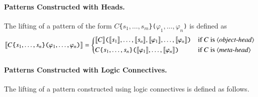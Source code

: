 \documentclass[UTF8,11pt]{article}
\theoremstyle{plain}
\theoremstyle{definition}
\theoremstyle{remark}
\newcommand{\denote}[1]{\llbracket{#1}\rrbracket}
\newcommand{\syntacc}[1]{\text{$\langle$\textit{#1}$\rangle$}}
\begin{document}
\paragraph{Patterns Constructed with Heads.}
The lifting of a pattern of the form
\texttt{$C$\{$s_1,\dots,s_m$\}($\varphi_1,\dots,\varphi_n$)} is defined as
\begin{align*}
\denote{C\texttt{\{}s_1,\dots,s_n\texttt{\}}\texttt{(}\varphi_1,
 \dots,\varphi_n\texttt{)}}
 =
\begin{cases*}
\denote{C}\texttt{(}\denote{s_1},\dots,\denote{s_n},\denote{
 \varphi_1},\dots,\denote{\varphi_n}\texttt{)} & if $C$ is
 \syntacc{object-head}\\
C\texttt{\{}s_1,\dots,s_n\texttt{\}}\texttt{(}\denote{
 \varphi_1},\dots,\denote{\varphi_n}\texttt{)} & if $C$ is
 \syntacc{meta-head}
\end{cases*}
\end{align*}

\paragraph{Patterns Constructed with Logic Connectives.}
The lifting of a pattern constructed using logic connectives is defined as
follows.
\end{document}
